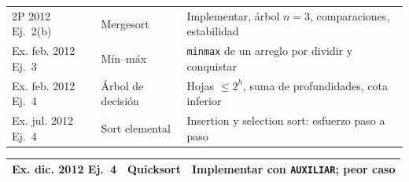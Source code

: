 {\begin{tabularx}{\textwidth}{@{}>{\raggedright\arraybackslash}p{2.95cm}>{\raggedright\arraybackslash}p{2.75cm}>{\raggedright\arraybackslash}X@{}}
2P 2012 Ej.~2(b) & Mergesort & Implementar, árbol $n=3$, comparaciones, estabilidad \\
Ex. feb. 2012 Ej.~3 & Mín--máx & \texttt{minmax} de un arreglo por dividir y conquistar \\
Ex. feb. 2012 Ej.~4 & Árbol de decisión & Hojas $\le 2^h$, suma de profundidades, cota inferior \\
Ex. jul. 2012 Ej.~4 & Sort elemental & Insertion y selection sort: esfuerzo paso a paso \\
\end{tabularx}\par\vspace{-\parskip}
\begin{tabularx}{\textwidth}{@{}>{\raggedright\arraybackslash}p{2.95cm}>{\raggedright\arraybackslash}p{2.75cm}>{\raggedright\arraybackslash}X@{}}
Ex. dic. 2012 Ej.~4 & Quicksort & Implementar con \texttt{AUXILIAR}; peor caso \\
\bottomrule
\end{tabularx}

}
